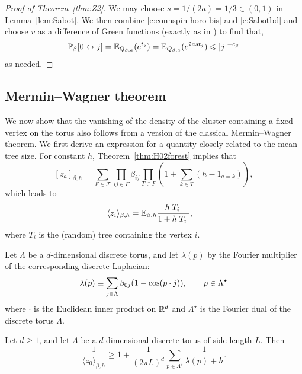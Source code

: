 \documentclass[11pt]{amsart}
\numberwithin{equation}{section}
\numberwithin{theorem}{section}
\newcommand{\cc}[1]{\mathcal{#1}}
\newcommand{\cb}[1]{\left[#1\right ]} %
\newcommand{\ab}[1]{\langle #1 \rangle} %
\begin{document}
\begin{proof}[Proof of Theorem~\ref{thm:Z2}] 
  We may choose $s=1/(2a) = 1/3  \in (0,1)$ in Lemma~\ref{lem:Sabot}.
  We then combine \eqref{e:connspin-horo-bis} and \eqref{e:Sabotbd}
  and choose $v$ as a difference of Green functions (exactly as in \cite[Section~2.2]{1907.07949})
  to find that,
  \begin{equation}
    \mathbb{P}_\beta[0\leftrightarrow j] =\mathbb{E}_{Q_{\beta,a}}(e^{t_j}) =\mathbb{E}_{Q_{\beta,a}}(e^{2ast_j}) \leqslant |j|^{-c_\beta}
  \end{equation}
  as needed.
\end{proof}


\subsection{Mermin--Wagner theorem}

We now show that the vanishing of the density of the cluster
containing a fixed vertex on the torus also follows from a version of
the classical Mermin--Wagner theorem.  We first derive an expression
for a quantity closely related to the mean tree size.  For constant
$h$, Theorem~\ref{thm:H02forest} implies that
\begin{equation}
  \cb{z_{a}}_{\beta,h} = \sum_{F\in\cc F}\prod_{ij\in F}\beta_{ij}
  \prod_{T\in F}(1+\sum_{k\in T}(h-1_{a=k})),
\end{equation}
which leads to
\begin{align}
  \label{eq:MW2}
  \ab{z_{i}}_{\beta,h} &= 
                         \E_{\beta,h} \frac{h\abs{T_{i}}}{1+h\abs{T_{i}}},
\end{align}
where $T_i$ is the (random) tree containing the vertex $i$.

Let $\Lambda$ be a $d$-dimensional discrete torus, and let $\lambda(p)$ by the
Fourier multiplier of the corresponding discrete Laplacian:
\begin{equation}
  \label{e:lambda}
  \lambda(p) \equiv \sum_{j\in \Lambda} \beta_{0j} (1-\cos(p\cdot j)),
  \qquad p\in \Lambda^{\star}
\end{equation}
where $\cdot$ is the Euclidean inner product on $\mathbb{R}^d$ and
$\Lambda^{\star}$ is the Fourier dual of the discrete torus $\Lambda$.


\begin{theorem} \label{thm:MW}
  Let $d \geq 1$, and let $\Lambda$ be a $d$-dimensional discrete torus of side length $L$. Then
  \begin{equation} \label{e:MW1}
    \frac{1}{\ab{z_0}_{\beta,h}} \ge 1+ \frac{1}{(2\pi L)^d} \sum_{p \in \Lambda^{\star}} \frac{1}{\lambda(p) + h}.
  \end{equation}
\end{theorem}
\end{document}
